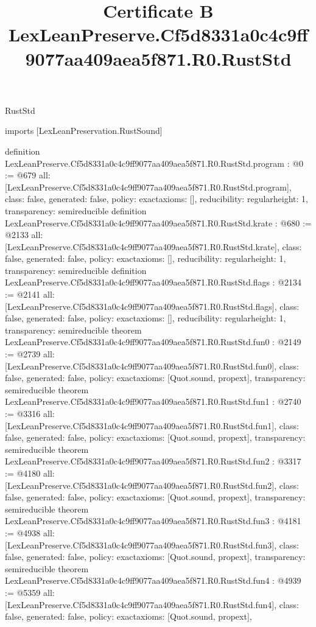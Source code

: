 \begin{lexlean}{RustStd}
\title{Certificate B LexLeanPreserve.Cf5d8331a0c4c9ff9077aa409aea5f871.R0.RustStd}
\begin{coremodule}
imports [LexLeanPreservation.RustSound]

definition LexLeanPreserve.Cf5d8331a0c4c9ff9077aa409aea5f871.R0.RustStd.program : @0 := @679 {
  all: [LexLeanPreserve.Cf5d8331a0c4c9ff9077aa409aea5f871.R0.RustStd.program],
  class: false,
  generated: false,
  policy: exact{axioms: []},
  reducibility: regular{height: 1},
  transparency: semireducible
}
definition LexLeanPreserve.Cf5d8331a0c4c9ff9077aa409aea5f871.R0.RustStd.krate : @680 := @2133 {
  all: [LexLeanPreserve.Cf5d8331a0c4c9ff9077aa409aea5f871.R0.RustStd.krate],
  class: false,
  generated: false,
  policy: exact{axioms: []},
  reducibility: regular{height: 1},
  transparency: semireducible
}
definition LexLeanPreserve.Cf5d8331a0c4c9ff9077aa409aea5f871.R0.RustStd.flags : @2134 := @2141 {
  all: [LexLeanPreserve.Cf5d8331a0c4c9ff9077aa409aea5f871.R0.RustStd.flags],
  class: false,
  generated: false,
  policy: exact{axioms: []},
  reducibility: regular{height: 1},
  transparency: semireducible
}
theorem LexLeanPreserve.Cf5d8331a0c4c9ff9077aa409aea5f871.R0.RustStd.fun0 : @2149 := @2739 {
  all: [LexLeanPreserve.Cf5d8331a0c4c9ff9077aa409aea5f871.R0.RustStd.fun0],
  class: false,
  generated: false,
  policy: exact{axioms: [Quot.sound, propext]},
  transparency: semireducible
}
theorem LexLeanPreserve.Cf5d8331a0c4c9ff9077aa409aea5f871.R0.RustStd.fun1 : @2740 := @3316 {
  all: [LexLeanPreserve.Cf5d8331a0c4c9ff9077aa409aea5f871.R0.RustStd.fun1],
  class: false,
  generated: false,
  policy: exact{axioms: [Quot.sound, propext]},
  transparency: semireducible
}
theorem LexLeanPreserve.Cf5d8331a0c4c9ff9077aa409aea5f871.R0.RustStd.fun2 : @3317 := @4180 {
  all: [LexLeanPreserve.Cf5d8331a0c4c9ff9077aa409aea5f871.R0.RustStd.fun2],
  class: false,
  generated: false,
  policy: exact{axioms: [Quot.sound, propext]},
  transparency: semireducible
}
theorem LexLeanPreserve.Cf5d8331a0c4c9ff9077aa409aea5f871.R0.RustStd.fun3 : @4181 := @4938 {
  all: [LexLeanPreserve.Cf5d8331a0c4c9ff9077aa409aea5f871.R0.RustStd.fun3],
  class: false,
  generated: false,
  policy: exact{axioms: [Quot.sound, propext]},
  transparency: semireducible
}
theorem LexLeanPreserve.Cf5d8331a0c4c9ff9077aa409aea5f871.R0.RustStd.fun4 : @4939 := @5359 {
  all: [LexLeanPreserve.Cf5d8331a0c4c9ff9077aa409aea5f871.R0.RustStd.fun4],
  class: false,
  generated: false,
  policy: exact{axioms: [Quot.sound, propext]},
}
\end{coremodule}
\end{lexlean}

